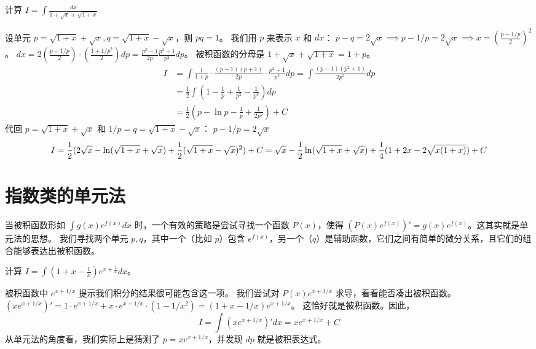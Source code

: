 \documentclass[lang=cn,newtx,10pt,scheme=chinese]{elegantbook}
\begin{document}
\begin{problem}
    计算 $I = \int \frac{dx}{1+\sqrt{x}+\sqrt{1+x}}$
\end{problem}
\begin{solution}
    设单元 $p=\sqrt{1+x}+\sqrt{x}, q=\sqrt{1+x}-\sqrt{x}$，则 $pq=1$。
    我们用 $p$ 来表示 $x$ 和 $dx$：
    $p-q = 2\sqrt{x} \implies p - 1/p = 2\sqrt{x} \implies x = (\frac{p-1/p}{2})^2$。
    $dx = 2(\frac{p-1/p}{2}) \cdot (\frac{1+1/p^2}{2}) dp = \frac{p^2-1}{2p} \frac{p^2+1}{p^2} dp$。
    被积函数的分母是 $1+\sqrt{x}+\sqrt{1+x} = 1+p$。
    \begin{align*}
        I &= \int \frac{1}{1+p} \cdot \frac{(p-1)(p+1)}{2p} \cdot \frac{p^2+1}{p^2} dp = \int \frac{(p-1)(p^2+1)}{2p^3} dp \\
        &= \frac{1}{2} \int (1 - \frac{1}{p} + \frac{1}{p^2} - \frac{1}{p^3}) dp \\
        &= \frac{1}{2} (p - \ln p - \frac{1}{p} + \frac{1}{2p^2}) + C
    \end{align*}
    代回 $p = \sqrt{1+x}+\sqrt{x}$ 和 $1/p = q = \sqrt{1+x}-\sqrt{x}$：
    $p-1/p = 2\sqrt{x}$
    \begin{equation*}
        I = \frac{1}{2} (2\sqrt{x} - \ln(\sqrt{1+x}+\sqrt{x}) + \frac{1}{2}(\sqrt{1+x}-\sqrt{x})^2) + C \\
        = \sqrt{x} - \frac{1}{2}\ln(\sqrt{1+x}+\sqrt{x}) + \frac{1}{4}(1+2x-2\sqrt{x(1+x)}) + C
    \end{equation*}
\end{solution}

\section{指数类的单元法}
当被积函数形如 $\int g(x) e^{f(x)} dx$ 时，一个有效的策略是尝试寻找一个函数 $P(x)$，使得 $(P(x)e^{f(x)})' = g(x)e^{f(x)}$。这其实就是单元法的思想。
我们寻找两个单元 $p, q$，其中一个（比如 $p$）包含 $e^{f(x)}$，另一个（$q$）是辅助函数，它们之间有简单的微分关系，且它们的组合能够表达出被积函数。

\begin{problem}
    计算 $I = \int(1+x-\frac{1}{x})e^{x+\frac{1}{x}}dx$。
\end{problem}
\begin{solution}
    被积函数中 $e^{x+1/x}$ 提示我们积分的结果很可能包含这一项。
    我们尝试对 $P(x)e^{x+1/x}$ 求导，看看能否凑出被积函数。
    $(x e^{x+1/x})' = 1 \cdot e^{x+1/x} + x \cdot e^{x+1/x} \cdot (1-1/x^2) = (1+x-1/x) e^{x+1/x}$。
    这恰好就是被积函数。因此，
    \begin{equation*}
        I = \int (x e^{x+1/x})' dx = x e^{x+1/x} + C
    \end{equation*}
    从单元法的角度看，我们实际上是猜测了 $p=xe^{x+1/x}$，并发现 $dp$ 就是被积表达式。
\end{solution}
\end{document}
